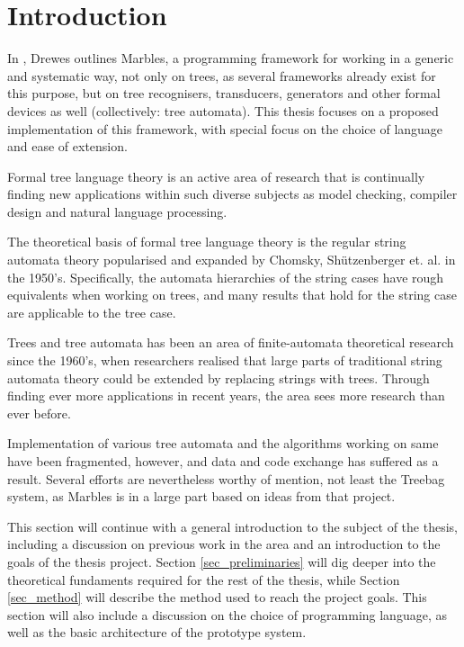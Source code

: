 \section{Introduction}

In \cite{drewes_marbles}, Drewes outlines Marbles, a programming framework
for working in a generic and systematic way, not only on trees, as several
frameworks already exist for this purpose, but on tree recognisers,
transducers, generators and other formal devices as well (collectively:
tree automata). This thesis focuses on a proposed implementation of this
framework, with special focus on the choice of language and ease of
extension.

Formal tree language theory is an active area of research that is
continually finding new applications within such diverse subjects as model
checking, compiler design and natural language processing. 

The theoretical basis of formal tree language theory is the regular string
automata theory popularised and expanded by Chomsky, Shützenberger et. al.
in the 1950's. Specifically, the automata hierarchies of the string cases
have rough equivalents when working on trees, and many results that hold
for the string case are applicable to the tree case. 

Trees and tree automata has been an area of finite-automata theoretical
research since the 1960's, when researchers realised that large parts of
traditional string automata theory could be extended by replacing strings
with trees. Through finding ever more applications in recent years, the
area sees more research than ever before. 

Implementation of various tree automata and the algorithms working on same
have been fragmented, however, and data and code exchange has suffered as a
result. Several efforts are nevertheless worthy of mention, not least the
Treebag\cite{drewes_treebag} system, as Marbles is in a large part based on
ideas from that project.


This section will continue with a general introduction to the subject
of the thesis, including a discussion on previous work in the area and an
introduction to the goals of the thesis project. Section
\ref{sec_preliminaries} will dig deeper into the theoretical fundaments
required for the rest of the thesis, while Section \ref{sec_method} will
describe the method used to reach the project goals. This section will also
include a discussion on the choice of programming language, as well as the
basic architecture of the prototype system.

